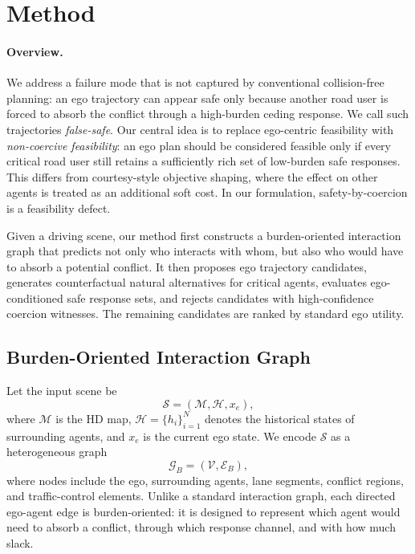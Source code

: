 \documentclass[10pt]{article}
\begin{document}
\section{Method}
\label{sec:method}

\paragraph{Overview.}
We address a failure mode that is not captured by conventional collision-free planning: an ego trajectory can appear safe only because another road user is forced to absorb the conflict through a high-burden ceding response. We call such trajectories \emph{false-safe}. Our central idea is to replace ego-centric feasibility with \emph{non-coercive feasibility}: an ego plan should be considered feasible only if every critical road user still retains a sufficiently rich set of low-burden safe responses. This differs from courtesy-style objective shaping, where the effect on other agents is treated as an additional soft cost. In our formulation, safety-by-coercion is a feasibility defect.

Given a driving scene, our method first constructs a burden-oriented interaction graph that predicts not only who interacts with whom, but also who would have to absorb a potential conflict. It then proposes ego trajectory candidates, generates counterfactual natural alternatives for critical agents, evaluates ego-conditioned safe response sets, and rejects candidates with high-confidence coercion witnesses. The remaining candidates are ranked by standard ego utility.

\subsection{Burden-Oriented Interaction Graph}
\label{sec:method_graph}

Let the input scene be
\begin{equation}
    \mathcal{S} = (\mathcal{M}, \mathcal{H}, x_e),
\end{equation}
where $\mathcal{M}$ is the HD map, $\mathcal{H}=\{h_i\}_{i=1}^{N}$ denotes the historical states of surrounding agents, and $x_e$ is the current ego state. We encode $\mathcal{S}$ as a heterogeneous graph
\begin{equation}
    \mathcal{G}_B = (\mathcal{V}, \mathcal{E}_B),
\end{equation}
where nodes include the ego, surrounding agents, lane segments, conflict regions, and traffic-control elements. Unlike a standard interaction graph, each directed ego-agent edge is burden-oriented: it is designed to represent which agent would need to absorb a conflict, through which response channel, and with how much slack.
\end{document}
